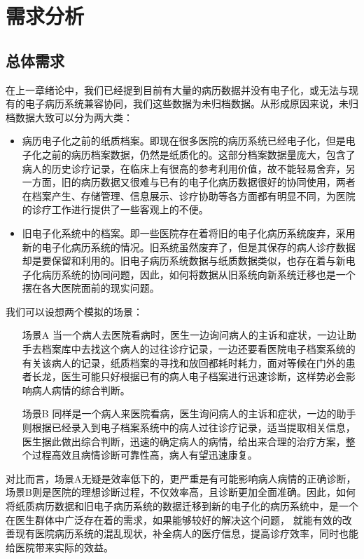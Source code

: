 \chapter{需求分析}
\label{chap:requirements-analysis}

\section{总体需求}
在上一章绪论中，我们已经提到目前有大量的病历数据并没有电子化，或无法与现有的电子病历系统兼容协同，我们这些数据为未归档数据。从形成原因来说，未归档数据大致可以分为两大类：
\begin{itemize}
	\item 病历电子化之前的纸质档案。即现在很多医院的病历系统已经电子化，但是电子化之前的病历档案数据，仍然是纸质化的。这部分档案数据量庞大，包含了病人的历史诊疗记录，在临床上有很高的参考利用价值，故不能轻易舍弃，另一方面，旧的病历数据又很难与已有的电子化病历数据很好的协同使用，两者在档案产生、存储管理、信息展示、诊疗协助等各方面都有明显不同，为医院的诊疗工作进行提供了一些客观上的不便。
	\item 旧电子化系统中的档案。即一些医院存在着将旧的电子化病历系统废弃，采用新的电子化病历系统的情况。旧系统虽然废弃了，但是其保存的病人诊疗数据却是要保留和利用的。旧电子病历系统数据与纸质数据类似，也存在着与新电子化病历系统的协同问题，因此，如何将数据从旧系统向新系统迁移也是一个摆在各大医院面前的现实问题。
\end{itemize}
我们可以设想两个模拟的场景：
\begin{itemize}
	\item[场景A] 当一个病人去医院看病时，医生一边询问病人的主诉和症状，一边让助手去档案库中去找这个病人的过往诊疗记录，一边还要看医院电子档案系统的有关该病人的记录，纸质档案的寻找和放回都耗时耗力，面对等候在门外的患者长龙，医生可能只好根据已有的病人电子档案进行迅速诊断，这样势必会影响病人病情的综合判断。
	\item[场景B] 同样是一个病人来医院看病，医生询问病人的主诉和症状，一边的助手则根据已经录入到电子档案系统中的病人过往诊疗记录，适当提取相关信息，医生据此做出综合判断，迅速的确定病人的病情，给出来合理的治疗方案，整个过程高效且病情诊断可靠性高，病人有望迅速康复。
\end{itemize}
对比而言，场景A无疑是效率低下的，更严重是有可能影响病人病情的正确诊断，场景B则是医院的理想诊断过程，不仅效率高，且诊断更加全面准确。因此，如何将纸质病历数据和旧电子病历系统的数据迁移到新的电子化的病历系统中，是一个在医生群体中广泛存在着的需求，如果能够较好的解决这个问题， 就能有效的改善现有医院病历系统的混乱现状，补全病人的医疗信息，提高诊疗效率，同时也能给医院带来实际的效益。

